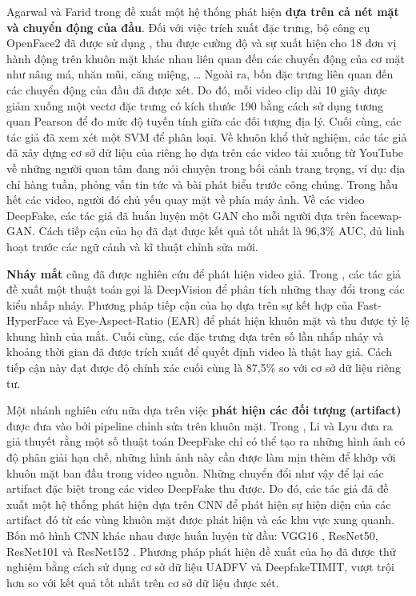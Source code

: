 \documentclass{article}
\begin{document}
Agarwal và Farid trong  đề xuất một hệ thống phát hiện \textbf{dựa trên cả nét mặt và chuyển động của đầu}. Đối với việc trích xuất đặc trưng, bộ công cụ OpenFace2 đã được sử dụng , thu được cường độ và sự xuất hiện cho 18 đơn vị hành động trên khuôn mặt khác nhau liên quan đến các chuyển động của cơ mặt như nâng má, nhăn mũi, căng miệng, … Ngoài ra, bốn đặc trưng liên quan đến các chuyển động của đầu đã được xét. Do đó, mỗi video clip dài 10 giây được giảm xuống một vectơ đặc trưng có kích thước 190 bằng cách sử dụng tương quan Pearson để đo mức độ tuyến tính giữa các đối tượng địa lý. Cuối cùng, các tác giả đã xem xét một SVM để phân loại. Về khuôn khổ thử nghiệm, các tác giả đã xây dựng cơ sở dữ liệu của riêng họ dựa trên các video tải xuống từ YouTube về những người quan tâm đang nói chuyện trong bối cảnh trang trọng, ví dụ: địa chỉ hàng tuần, phỏng vấn tin tức và bài phát biểu trước công chúng. Trong hầu hết các video, người đó chủ yếu quay mặt về phía máy ảnh. Về các video DeepFake, các tác giả đã huấn luyện một GAN cho mỗi người dựa trên facewap-GAN. Cách tiếp cận của họ đã đạt được kết quả tốt nhất là 96,3\% AUC, đủ linh hoạt trước các ngữ cảnh và kĩ thuật chỉnh sửa mới.

\textbf{Nháy mắt}  cũng đã được nghiên cứu để phát hiện video giả. Trong , các tác giả đề xuất một thuật toán gọi là DeepVision để phân tích những thay đổi trong các kiểu nhấp nháy. Phương pháp tiếp cận của họ dựa trên sự kết hợp của Fast-HyperFace  và Eye-Aspect-Ratio (EAR)  để phát hiện khuôn mặt và thu được tỷ lệ khung hình của mắt. Cuối cùng, các đặc trưng dựa trên số lần nhấp nháy và khoảng thời gian đã được trích xuất để quyết định video là thật hay giả. Cách tiếp cận này đạt được độ chính xác cuối cùng là 87,5\% so với cơ sở dữ liệu riêng tư.

Một nhánh nghiên cứu nữa dựa trên việc \textbf{phát hiện các đối tượng (artifact)} được đưa vào bởi pipeline chỉnh sửa trên khuôn mặt. Trong , Li và Lyu đưa ra giả thuyết rằng một số thuật toán DeepFake chỉ có thể tạo ra những hình ảnh có độ phân giải hạn chế, những hình ảnh này cần được làm mịn thêm để khớp với khuôn mặt ban đầu trong video nguồn. Những chuyển đổi như vậy để lại các artifact đặc biệt trong các video DeepFake thu được. Do đó, các tác giả đã đề xuất một hệ thống phát hiện dựa trên CNN để phát hiện sự hiện diện của các artifact đó từ các vùng khuôn mặt được phát hiện và các khu vực xung quanh. Bốn mô hình CNN khác nhau được huấn luyện từ đầu: VGG16 , ResNet50, ResNet101 và ResNet152 . Phương pháp phát hiện đề xuất của họ đã được thử nghiệm bằng cách sử dụng cơ sở dữ liệu UADFV và DeepfakeTIMIT, vượt trội hơn so với kết quả tốt nhất trên cơ sở dữ liệu được xét.
\end{document}
